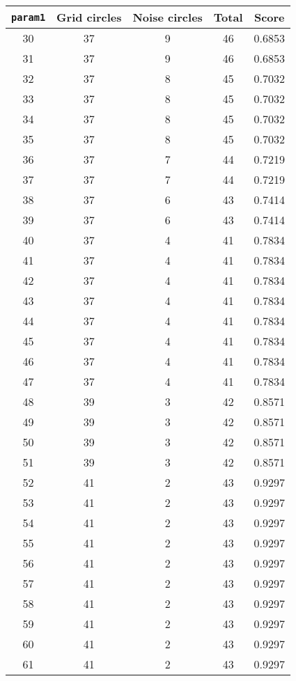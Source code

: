 \documentclass[letterpaper, 12pt]{article}
\begin{document}
\begin{longtable}{|c|c|c|c|c|}
\hline
\textbf{\texttt{param1}} & \textbf{Grid circles} & \textbf{Noise circles} & \textbf{Total} & \textbf{Score} \\
\hline
30 & 37 & 9 & 46 & 0.6853 \\
\hline
31 & 37 & 9 & 46 & 0.6853 \\
\hline
32 & 37 & 8 & 45 & 0.7032 \\
\hline
33 & 37 & 8 & 45 & 0.7032 \\
\hline
34 & 37 & 8 & 45 & 0.7032 \\
\hline
35 & 37 & 8 & 45 & 0.7032 \\
\hline
36 & 37 & 7 & 44 & 0.7219 \\
\hline
37 & 37 & 7 & 44 & 0.7219 \\
\hline
38 & 37 & 6 & 43 & 0.7414 \\
\hline
39 & 37 & 6 & 43 & 0.7414 \\
\hline
40 & 37 & 4 & 41 & 0.7834 \\
\hline
41 & 37 & 4 & 41 & 0.7834 \\
\hline
42 & 37 & 4 & 41 & 0.7834 \\
\hline
43 & 37 & 4 & 41 & 0.7834 \\
\hline
44 & 37 & 4 & 41 & 0.7834 \\
\hline
45 & 37 & 4 & 41 & 0.7834 \\
\hline
46 & 37 & 4 & 41 & 0.7834 \\
\hline
47 & 37 & 4 & 41 & 0.7834 \\
\hline
48 & 39 & 3 & 42 & 0.8571 \\
\hline
49 & 39 & 3 & 42 & 0.8571 \\
\hline
50 & 39 & 3 & 42 & 0.8571 \\
\hline
51 & 39 & 3 & 42 & 0.8571 \\
\hline
52 & 41 & 2 & 43 & 0.9297 \\
\hline
53 & 41 & 2 & 43 & 0.9297 \\
\hline
54 & 41 & 2 & 43 & 0.9297 \\
\hline
55 & 41 & 2 & 43 & 0.9297 \\
\hline
56 & 41 & 2 & 43 & 0.9297 \\
\hline
57 & 41 & 2 & 43 & 0.9297 \\
\hline
58 & 41 & 2 & 43 & 0.9297 \\
\hline
59 & 41 & 2 & 43 & 0.9297 \\
\hline
60 & 41 & 2 & 43 & 0.9297 \\
\hline
61 & 41 & 2 & 43 & 0.9297 \\

\end{longtable}
\end{document}
